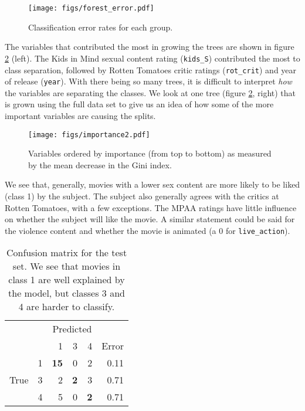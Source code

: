 \begin{figure}
\begin{center}
\texttt{[image: figs/forest\_error.pdf]}
\caption{Classification error rates for each group.}
\label{error}
\end{center}
\end{figure}

The variables that contributed the most in growing the trees are shown in figure \ref{import} (left). The Kids in Mind sexual content rating (\texttt{kids\_S}) contributed the most to class separation, followed by Rotten Tomatoes critic ratings (\texttt{rot\_crit}) and year of release (\texttt{year}). With there being so many trees, it is difficult to interpret \emph{how} the variables are separating the classes. We look at one tree (figure \ref{import}, right) that is grown using the full data set to give us an idea of how some of the more important variables are causing the splits. 

\begin{figure}
\begin{center}
\texttt{[image: figs/importance2.pdf]}
\caption{Variables ordered by importance (from top to bottom) as measured by the mean decrease in the Gini index.}
\label{import}
\end{center}
\end{figure}

We see that, generally, movies with a lower sex content are more likely to be liked (class 1) by the subject. The subject also generally agrees with the critics at Rotten Tomatoes, with a few exceptions. The MPAA ratings have little influence on whether the subject will like the movie. A similar statement could be said for the violence content and whether the movie is animated (a 0 for \texttt{live\_action}).

\begin{table}
\begin{center}
\begin{tabular}{lr|rrr|r}
     & \multicolumn{1}{l}{}   & \multicolumn{3}{c}{Predicted} \\
     &    &  1 & 3 & 4 & Error \\ \cline{2-6}
     & 1  & \textbf{15} & 0 & 2 & 0.11 \\
True & 3  &  2 & \textbf{2} & 3 & 0.71 \\
     & 4  &  5 & 0 & \textbf{2} & 0.71 \\
\end{tabular}
\caption{Confusion matrix for the test set. We see that movies in class 1 are well explained by the model, but classes 3 and 4 are harder to classify.}
\label{confuse}
\end{center}
\end{table}

